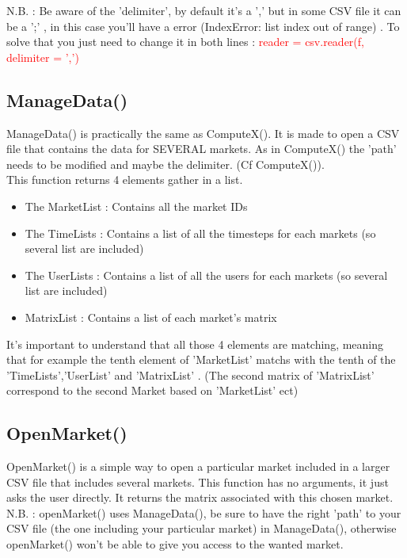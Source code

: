 \documentclass{report}
\begin{document}
N.B. : Be aware of the 'delimiter', by default it's a ',' but in some CSV file it can be a ';' , in this case you'll have a error (IndexError: list index out of range) . To solve that you just need to change it in both lines : \textcolor{red}{reader = csv.reader(f, delimiter = ',')}



\subsection{ManageData()}

ManageData() is practically the same as ComputeX(). It is made to open a CSV file that contains the data for SEVERAL markets. As in ComputeX() the 'path' needs to be modified and maybe the delimiter. (Cf ComputeX()).\\

This function returns 4 elements gather in a list. 
\begin{itemize}
\item The MarketList : Contains all the market IDs
\item The TimeLists : Contains a list of all the timesteps for each markets (so several list are included)
\item The UserLists : Contains a list of all the users for each markets (so several list are included)
\item MatrixList : Contains a list of each market's matrix
\end{itemize}

It's important to understand that all those 4 elements are matching, meaning that for example the tenth element of 'MarketList' matchs with the tenth of the 'TimeLists','UserList' and 'MatrixList' . (The second matrix of 'MatrixList' correspond to the second Market based on 'MarketList' ect)

\subsection{OpenMarket()}

OpenMarket() is a simple way to open a particular market included in a larger CSV file that includes several markets. This function has no arguments, it just asks the user directly. It returns the matrix associated with this chosen market. \\

N.B. : openMarket() uses ManageData(), be sure to have the right 'path' to your CSV file (the one including your particular market) in ManageData(), otherwise openMarket() won't be able to give you access to the wanted market.
\end{document}

